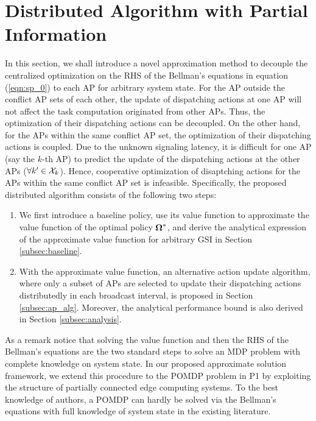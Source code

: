 \section{Distributed Algorithm with Partial Information}
\label{sec:algorithm}

In this section, we shall introduce a novel approximation method to decouple the centralized optimization on the RHS of the Bellman's equations in equation (\ref{eqn:sp_0}) to each AP for arbitrary system state.
For the AP outside the conflict AP sets of each other, the update of dispatching actions at one AP will not affect the task computation originated from other APs.
Thus, the optimization of their dispatching actions can be decoupled.
On the other hand, for the APs within the same conflict AP set, the optimization of their dispatching actions is coupled.
Due to the unknown signaling latency, it is difficult for one AP (say the $k$-th AP) to predict the update of the dispatching actions at the other APs ($\forall k' \in\mathcal{X}_{k}$).
Hence, cooperative optimization of disaptching actions for the APs within the same conflict AP set is infeasible.
Specifically, the proposed distributed algorithm consists of the following two steps:
\begin{enumerate}
    \item We first introduce a baseline policy, use its value function to approximate the value function of the optimal policy $\boldsymbol{\Omega}^*$, and derive the analytical expression of the approximate value function for arbitrary GSI in Section \ref{subsec:baseline}.
    \item With the approximate value function, an alternative action update algorithm, where only a subset of APs are selected to update their dispatching actions distributedly in each broadcast interval, is proposed in Section \ref{subsec:ap_alg}.
    Moreover, the analytical performance bound is also derived in Section \ref{subsec:analysis}.
\end{enumerate}
As a remark notice that solving the value function and then the RHS of the Bellman's equations are the two standard steps to solve an MDP problem with complete knowledge on system state.
In our proposed approximate solution framework, we extend this procedure to the POMDP problem in P1 by exploiting the structure of partially connected edge computing systems.
To the best knowledge of authors, a POMDP can hardly be solved via the Bellman's equations with full knowledge of system state in the existing literature.

